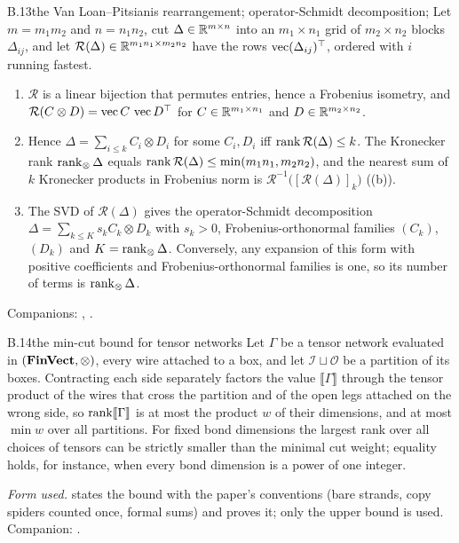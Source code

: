 \begin{auxresult}{B.13}{the Van Loan--Pitsianis rearrangement; operator-Schmidt decomposition}{\citep{loan1993approximation};
\citep{xvanloan2000ubiquitous}}
Let $m=m_1m_2$ and $n=n_1n_2$, cut $\Delta\in\mathbb{R}^{m\times n}$ into an $m_1\times n_1$ grid of $m_2\times n_2$ blocks
$\Delta_{ij}$, and let $\mathcal R(\Delta)\in\mathbb{R}^{m_1n_1\times m_2n_2}$ have the rows $\operatorname{vec}(\Delta_{ij})^{\top}$, ordered with
$i$ running fastest.
\begin{enumerate}[label=(\alph*)]
  \item $\mathcal R$ is a linear bijection that permutes entries, hence a Frobenius isometry, and
    $\mathcal R(C\otimes D)=\operatorname{vec} C\,\operatorname{vec} D^{\top}$ for $C\in\mathbb{R}^{m_1\times n_1}$ and $D\in\mathbb{R}^{m_2\times n_2}$.
  \item Hence $\Delta=\sum_{i\le k}C_i\otimes D_i$ for some $C_i,D_i$ iff $\operatorname{rank}\mathcal R(\Delta)\le k$. The Kronecker
    rank $\operatorname{rank}_\otimes\Delta$ equals $\operatorname{rank}\mathcal R(\Delta)\le\min(m_1n_1,m_2n_2)$, and the nearest sum of $k$ Kronecker
    products in Frobenius norm is $\mathcal R^{-1}\big([\mathcal R(\Delta)]_k\big)$ ((b)).
  \item The SVD of $\mathcal R(\Delta)$ gives the operator-Schmidt decomposition $\Delta=\sum_{k\le K}s_kC_k\otimes D_k$
    with $s_k>0$, Frobenius-orthonormal families $(C_k)$, $(D_k)$ and $K=\operatorname{rank}_\otimes\Delta$. Conversely, any expansion of
    this form with positive coefficients and Frobenius-orthonormal families is one, so its number of terms is
    $\operatorname{rank}_\otimes\Delta$.
\end{enumerate}
\end{auxresult}
\noindent Companions: , .

\begin{auxresult}{B.14}{the min-cut bound for tensor networks}{\citep{xcui2016quantum}}
Let $\Gamma$ be a tensor network evaluated in $(\mathbf{FinVect},\otimes)$, every wire attached to a box, and let
$\mathcal I\sqcup\mathcal O$ be a partition of its boxes. Contracting each side separately factors the value
$\llbracket\Gamma\rrbracket$ through the tensor product of the wires that cross the partition and of the open legs
attached on the wrong side, so $\operatorname{rank}\llbracket\Gamma\rrbracket$ is at most the product $w$ of their dimensions, and at most $\min w$ over all
partitions. For fixed bond dimensions the largest rank over all choices of tensors can be strictly smaller than the
minimal cut weight; equality holds, for instance, when every bond dimension is a power of one integer.
\end{auxresult}
\noindent\emph{Form used.}  states the bound with the paper's conventions (bare strands, copy
spiders counted once, formal sums) and proves it; only the upper bound is used. Companion: .

